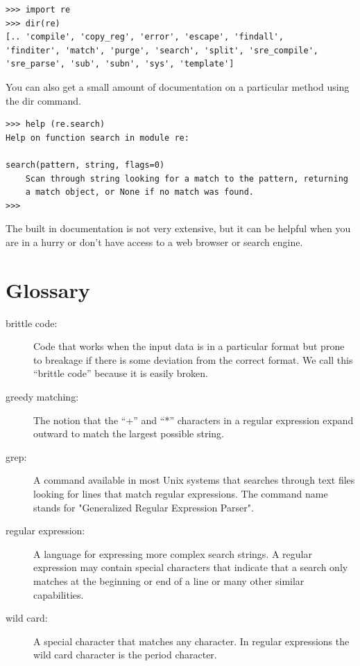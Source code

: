 \documentclass[11pt]{book}
\begin{document}
\beforeverb
\begin{verbatim}
>>> import re
>>> dir(re)
[.. 'compile', 'copy_reg', 'error', 'escape', 'findall', 
'finditer', 'match', 'purge', 'search', 'split', 'sre_compile', 
'sre_parse', 'sub', 'subn', 'sys', 'template']
\end{verbatim}
\afterverb
%
You can also get a small amount of documentation on a particular method using the dir command.

\beforeverb
\begin{verbatim}
>>> help (re.search)
Help on function search in module re:

search(pattern, string, flags=0)
    Scan through string looking for a match to the pattern, returning
    a match object, or None if no match was found.
>>> 
\end{verbatim}
\afterverb
%
The built in documentation is not very extensive, but it can be helpful when you are in a hurry
or don't have access to a web browser or search engine.

\section{Glossary}

\begin{description}

\item[brittle code:]
Code that works when the input data is in a particular format but prone to breakage
if there is some deviation from the correct format.  We call this ``brittle code'' 
because it is easily broken.

\item[greedy matching:]
The notion that the ``+'' and ``*'' characters in a regular expression expand outward to match the largest possible string.

\item[grep:]
A command available in most Unix systems that searches through text files looking for lines that match regular expressions.  The command name stands for "Generalized Regular Expression Parser".

\item[regular expression:]
A language for expressing more complex search strings.  A regular expression may contain special characters that indicate that a search only matches at the beginning or end of a line or many other similar capabilities.

\item[wild card:]
A special character that matches any character.   In regular expressions the wild card character is the period character.

\end{description}
\end{document}
